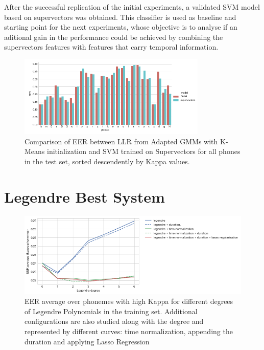 After the successful replication of the initial experiments, a validated SVM model based on
supervectors was obtained. This classifier is used as baseline and starting point for
the next experiments,
whose objective is to analyse if an aditional gain in the performance could be achieved by
combining the supervectors features with features that carry temporal information.

\begin{figure}[H]
	\centering
	\includegraphics[width=0.8\textwidth]{files/figures/results/gmm-vs-supervectors/gmm-vs-supervectors-heldout.png}
	\caption{Comparison of EER between LLR from Adapted GMMs with K-Means initialization
	and SVM trained on Supervectors for all phones in the test set, sorted descendently
	by Kappa values.}
	\label{fig:gmmSupervectorsTest}
\end{figure}

\section{Legendre Best System}

\begin{figure}[H]
	\centering
	\includegraphics[width=1.0\textwidth]{files/figures/results/legendre-dct/legendre-tunning.png}
	\caption{EER average over phonemes with high Kappa for different
	degrees of Legendre Polynomials in
	the training set. Additional configurations are also studied along with the degree and
	represented by different curves: time normalization, appending the duration and applying
	Lasso Regression}
	\label{fig:legendreTunning}
\end{figure}


